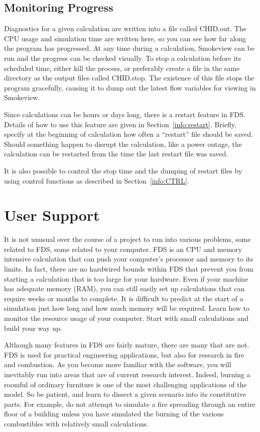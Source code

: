 \documentclass[11pt]{book}
\begin{document}
\section{Monitoring Progress}

Diagnostics for a given calculation are written into a file called {\ct CHID.out}.
The CPU usage and simulation time are written here, so you can see how
far along the program has progressed. At any time during a calculation,
Smokeview can be run and the progress can be checked visually.
To stop a calculation before its scheduled time, either
kill the process, or preferably create a file in the same directory as
the output files called {\ct CHID.stop}. The existence of this
file stops the program gracefully, causing it to dump out the
latest flow variables for viewing in Smokeview.

Since calculations can be hours or days long, there is a restart
feature in FDS. Details of how to use this feature
are given in Section~\ref{info:restart}. Briefly, specify at the
beginning of calculation how often a ``restart'' file should be saved.
Should something happen to disrupt the calculation, like a power
outage, the calculation can be restarted from the time the last restart
file was saved.

It is also possible to control the stop time and the dumping of restart files by using
control functions as described in Section~\ref{info:CTRL}.





\chapter{User Support}

It is not unusual over the course of a
project to run into various problems, some related to FDS, some related to your computer.
FDS is an CPU and memory intensive calculation that can push your computer's
processor and memory to its limits. In fact, there are no hardwired bounds within FDS that
prevent you from starting a calculation that is too large for your hardware.
Even if your machine has adequate memory (RAM), you can still easily set up calculations that can require
weeks or months to complete. It is difficult to predict at the start of a simulation just how long and
how much memory will be required. Learn how to monitor the resource usage of your computer.
Start with small calculations and build your way up.

Although many features in FDS are fairly mature, there are many that are not. FDS is used for
practical engineering applications, but also for research in fire and combustion. As you become
more familiar with the software, you will inevitably run into areas that are of current research
interest. Indeed, burning a roomful of ordinary furniture is one of the most challenging applications
of the model. So be patient, and learn to dissect a given scenario into its constitutive parts.
For example, do not attempt to simulate a fire spreading through an entire floor of a
building unless you have simulated the burning of the various combustibles with relatively small calculations.
\end{document}
